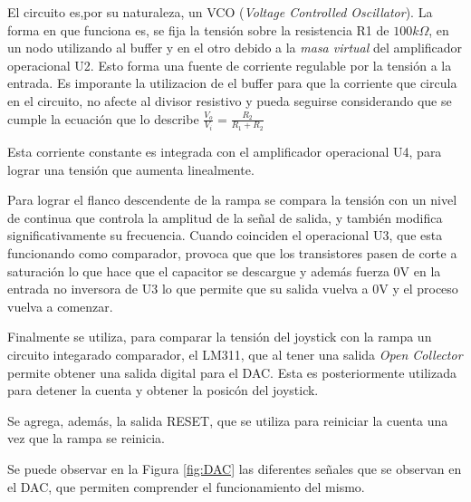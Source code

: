 El circuito es,por su naturaleza, un VCO (\textit{Voltage Controlled Oscillator}). La forma en que funciona es, se fija la tensi\'on sobre la resistencia R1 de $100k \Omega$, en un nodo utilizando al buffer y en el otro debido a la \textit{masa virtual} del amplificador operacional U2. Esto forma una fuente de corriente regulable por la tensi\'on a la entrada. Es imporante la utilizacion de el buffer para que la corriente que circula en el circuito, no afecte al divisor resistivo y pueda seguirse considerando que se cumple la ecuaci\'on que lo describe $\frac{V_o}{V_i} = \frac{R_2}{R_1+R_2}$

Esta corriente constante es integrada con el amplificador operacional U4, para lograr una tensi\'on que aumenta linealmente. 

Para lograr el flanco descendente de la rampa se compara la tensi\'on con un nivel de continua que controla la amplitud de la se\~nal de salida, y tambi\'en modifica significativamente su frecuencia. Cuando coinciden el operacional U3, que esta funcionando como comparador, provoca que que los transistores pasen de corte a saturaci\'on lo que hace que el capacitor se descargue y adem\'as fuerza 0V en la entrada no inversora de U3 lo que permite que su salida vuelva a 0V y el proceso vuelva a comenzar.

Finalmente se utiliza, para comparar la tensi\'on del joystick con la rampa un circuito integarado comparador, el LM311, que al tener una salida \textit{Open Collector} permite obtener una salida digital para el DAC. Esta es posteriormente utilizada para detener la cuenta y obtener la posic\'on del joystick.

Se agrega, adem\'as, la salida RESET, que se utiliza para reiniciar la cuenta una vez que la rampa se reinicia.

Se puede observar en la Figura \ref{fig:DAC} las diferentes se\~nales que se observan en el DAC, que permiten comprender el funcionamiento del mismo.

